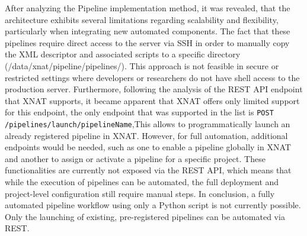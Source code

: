After analyzing the Pipeline implementation method, it was revealed, that the architecture exhibits several limitations regarding scalability and flexibility, particularly when integrating new automated components.
The fact that these pipelines require direct access to the server via SSH in order to manually copy the XML
descriptor and associated scripts to a specific directory (/data/xnat/pipeline/pipelines/). This approach is not
feasible in secure or restricted settings where developers or researchers do not have shell access to the production
server. Furthermore, following the analysis of the REST API endpoint that XNAT supports, it became apparent that XNAT offers only limited support for this endpoint, the only endpoint that was supported in the list is \texttt{POST /pipelines/launch/{pipelineName}},This allows to programmatically launch an already registered pipeline in XNAT.  However, for full
automation, additional endpoints would be needed, such as one to enable a pipeline globally in XNAT and
another to assign or activate a pipeline for a specific project. These functionalities are currently not exposed via
the REST API, which means that while the execution of pipelines can be automated, the full deployment and
project-level configuration still require manual steps.
In conclusion, a fully automated pipeline workflow using only a Python script is not currently possible.
Only the launching of existing, pre-registered pipelines can be automated via REST.

